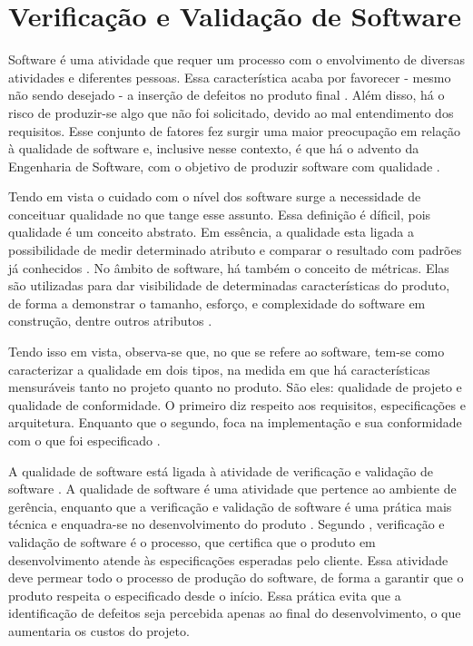 \section{Verificação e Validação de Software}
Software é uma atividade que requer um processo com o envolvimento de diversas atividades e diferentes pessoas. Essa característica acaba por favorecer - mesmo não sendo desejado - a inserção de defeitos no produto final \cite{trodo2009}. Além disso, há o risco de produzir-se algo que não foi solicitado, devido ao mal entendimento dos requisitos\cite{barbosaEtAl2009}. Esse conjunto de fatores fez surgir uma maior preocupação em relação à qualidade de software e, inclusive nesse contexto, é que há o advento da Engenharia de Software, com o objetivo de produzir software com qualidade \cite{buenoCampelo2013}.
\par
\indent Tendo em vista o cuidado com o nível dos software surge a necessidade de conceituar qualidade no que tange esse assunto. Essa definição é díficil, pois qualidade é um conceito abstrato. Em essência, a qualidade esta ligada a possibilidade de medir determinado atributo e comparar o resultado com padrões já conhecidos \cite{buenoCampelo2013}. No âmbito de software, há também o conceito de métricas. Elas são utilizadas para dar visibilidade de determinadas características do produto, de forma a demonstrar o tamanho, esforço, e complexidade do software em construção, dentre outros atributos \cite{abreu2011}.
\par
\indent Tendo isso em vista, observa-se que, no que se refere ao software, tem-se como caracterizar a qualidade em dois tipos, na medida em que há características mensuráveis tanto no projeto quanto no produto. São eles: qualidade de projeto e qualidade de conformidade. O primeiro diz respeito aos requisitos, especificações e arquitetura. Enquanto que o segundo, foca na implementação e sua conformidade com o que foi especificado \cite{buenoCampelo2013}.
\par
\indent A qualidade de software está ligada à atividade de verificação e validação de software \cite{buenoCampelo2013}. A qualidade de software é uma atividade que pertence ao ambiente de gerência, enquanto que a verificação e validação de software é uma prática mais técnica e enquadra-se no desenvolvimento do produto \cite{buenoCampelo2013}. Segundo , verificação e validação de software é o processo, que certifica que o produto em desenvolvimento atende às especificações esperadas pelo cliente. Essa atividade deve permear todo o processo de produção do software, de forma a garantir que o produto respeita o especificado desde o início. Essa prática evita que a identificação de defeitos seja percebida apenas ao final do desenvolvimento, o que aumentaria os custos do projeto.
